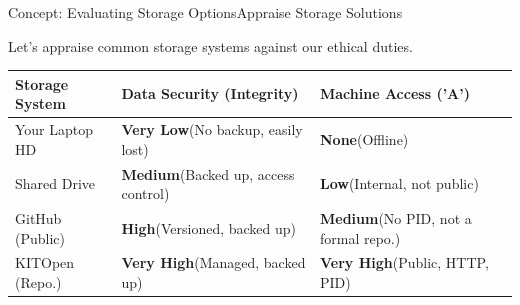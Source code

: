 \begin{frame}{Concept: Evaluating Storage Options}{Appraise Storage Solutions}
    
    Let's appraise common storage systems against our ethical duties.
    \begin{center}
        \begin{tabular}{p{}|p{}|p{}}
            \toprule
            \textbf{Storage System} & \textbf{Data Security (Integrity)} & \textbf{Machine Access ('A')} \\
            \midrule
            
            \pause
            Your Laptop HD & \textcolor{HMCBlue!40}{\textbf{Very Low}\newline (No backup, easily lost)} & \textcolor{HMCBlue!20}{\textbf{None}\newline (Offline)} \\
            \addlinespace
            
            \pause
            Shared Drive & \textcolor{HMCBlue!80}{\textbf{Medium}\newline (Backed up, access control)} & \textcolor{HMCBlue!60}{\textbf{Low}\newline (Internal, not public)} \\
            \addlinespace
            
            \pause
            GitHub (Public) & \textcolor{HMCBlue}{\textbf{High}\newline (Versioned, backed up)} & \textcolor{HMCBlue!80}{\textbf{Medium}\newline (No PID, not a formal repo.)} \\
            \addlinespace
            
            \pause
            KITOpen (Repo.) & \textbf{Very High}\newline (Managed, backed up) & \textbf{Very High}\newline (Public, HTTP, PID) \\
            \bottomrule
        \end{tabular}
    \end{center}
\end{frame}

